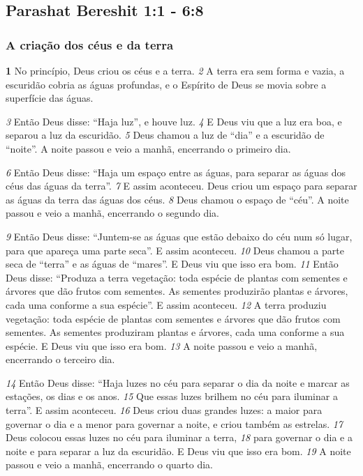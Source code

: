 \subsection*{Parashat Bereshit 1:1 - 6:8}
\subsubsection*{A criação dos céus e da terra}
\textbf{\large 1} 
No princípio, Deus criou os céus e a terra. 
\textit{\tiny 2} 
A   terra era sem forma e vazia, a
escuridão cobria as águas profundas, e o Espírito de Deus se movia sobre a superfície das águas. 

\bigskip
\textit{\tiny 3} 
Então Deus disse: “Haja luz”, e houve luz. 
\textit{\tiny 4} 
E Deus viu que a luz era boa, e separou a luz da escuridão. 
\textit{\tiny 5} Deus chamou a luz de “dia” e a escuridão de “noite”. A noite passou e veio a manhã, encerrando o primeiro dia.

\bigskip
\textit{\tiny 6} Então Deus disse: “Haja um espaço entre as águas, para separar as águas dos céus das águas da terra”. 
\textit{\tiny 7} 
E assim aconteceu. Deus criou um espaço para separar as águas da terra das águas dos céus. 
\textit{\tiny 8} 
Deus chamou o espaço de “céu”. A noite passou e veio a manhã, encerrando o segundo dia.

\bigskip
\textit{\tiny 9} 
Então     Deus disse: “Juntem-se as águas que estão debaixo do céu num só lugar, para que apareça uma parte seca”. E assim aconteceu. 
\textit{\tiny 10} 
Deus chamou a parte seca de “terra” e as águas de “mares”. E Deus viu que isso era bom. 
\textit{\tiny 11} 
Então Deus disse: “Produza a terra vegetação: toda espécie de plantas com sementes e árvores que dão frutos com sementes. As sementes produzirão plantas e árvores, cada uma conforme a sua espécie”. E assim aconteceu.
\textit{\tiny 12} 
A terra produziu vegetação: toda espécie de plantas com sementes e árvores que dão frutos com sementes. As sementes produziram plantas e árvores, cada uma conforme a sua espécie. E Deus viu que isso era bom.      
\textit{\tiny 13}
A noite passou e veio a manhã, encerrando o terceiro dia.

\bigskip
\textit{\tiny 14}
Então  Deus disse: “Haja luzes no céu para separar o dia da noite e marcar as estações, os dias e os anos. 
\textit{\tiny 15}
Que essas luzes brilhem no céu para iluminar a terra”. E assim aconteceu. 
\textit{\tiny 16}
Deus criou duas grandes luzes: a maior para governar o dia e a menor para governar a noite, e criou também as estrelas.
\textit{\tiny 17}
Deus colocou essas luzes no céu para iluminar a terra,
\textit{\tiny 18} 
para governar o dia e a noite e para separar a luz da escuridão. E Deus viu que isso era bom.
\textit{\tiny 19}
A noite passou e veio a manhã, encerrando o quarto dia.

